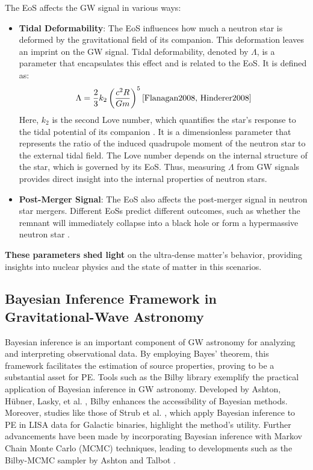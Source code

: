 \documentclass[12pt]{article}
\begin{document}
The EoS affects the GW signal in various ways:
\begin{itemize}

    \item \textbf{Tidal Deformability}: The EoS influences how much a neutron star is deformed by the gravitational field of its companion. This deformation leaves an imprint on the GW signal. Tidal deformability, denoted by \( \Lambda \), is a parameter that encapsulates this effect and is related to the EoS. It is defined as:
    \[ \Lambda = \frac{2}{3} k_2 \left( \frac{c^2 R}{Gm} \right)^5  \cite{Flanagan2008, Hinderer2008}\]
    Here, \( k_2 \) is the second Love number, which quantifies the star's response to the tidal potential of its companion \cite{Thorne1967, Binnington2009}. It is a dimensionless parameter that represents the ratio of the induced quadrupole moment of the neutron star to the external tidal field. The Love number depends on the internal structure of the star, which is governed by its EoS. Thus, measuring \( \Lambda \) from GW signals provides direct insight into the internal properties of neutron stars.


   \item \textbf{Post-Merger Signal}: The EoS also affects the post-merger signal in neutron star mergers. Different EoSs predict different outcomes, such as whether the remnant will immediately collapse into a black hole or form a hypermassive neutron star \cite{The-lifetime-of-binary-neutron-star-merger-remnants, EOS}.
\end{itemize}
 \textbf{These parameters shed light} on the ultra-dense matter's behavior, providing insights into nuclear physics and the state of matter in this scenarios.




\subsection{Bayesian Inference Framework in Gravitational-Wave Astronomy}
Bayesian inference is an important component of GW astronomy for analyzing and interpreting observational data. By employing Bayes' theorem, this framework facilitates the estimation of source properties, proving to be a substantial asset for PE. Tools such as the Bilby library exemplify the practical application of Bayesian inference in GW astronomy. Developed by Ashton, Hübner, Lasky, et al. \cite{Bilby: A user-friendly}, Bilby enhances the accessibility of Bayesian methods. Moreover, studies like those of Strub et al. \cite{Bayesian parameter-estimation of Galactic binaries}, which apply Bayesian inference to PE in LISA data for Galactic binaries, highlight the method's utility. Further advancements have been made by incorporating Bayesian inference with Markov Chain Monte Carlo (MCMC) techniques, leading to developments such as the Bilby-MCMC sampler by Ashton and Talbot \cite{Bilby-MCMC}.
\end{document}
